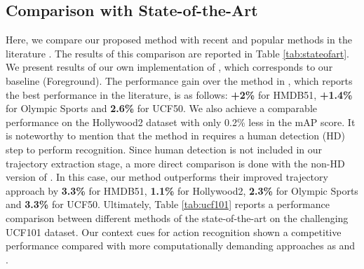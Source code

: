 \documentclass[runningheads]{llncs}
\begin{document}
\subsection{Comparison with State-of-the-Art}
Here, we compare our proposed method with recent and popular methods in the literature \cite{wang2013, jiang2012, jain2013}. The results of this comparison are reported in Table \ref{tab:stateofart}. We present results of our own implementation of \cite{wang2013}, which corresponds to our baseline (Foreground). The performance gain over the method in \cite{wang2013}, which reports the best performance in the literature, is as follows: \textbf{+2\%} for HMDB51, \textbf{+1.4\%} for Olympic Sports and \textbf{2.6\%} for UCF50. We also achieve a comparable performance on the Hollywood2 dataset with only 0.2\% less in the mAP score. It is noteworthy to mention that the method in \cite{wang2013} requires a human detection (HD) step to perform recognition. Since human detection is not included in our trajectory extraction stage, a more direct comparison is done with the non-HD version of \cite{wang2013}. In this case, our method outperforms their improved trajectory approach by \textbf{3.3\%} for HMDB51, \textbf{1.1\%} for Hollywood2, \textbf{2.3\%} for Olympic Sports and \textbf{3.3\%} for UCF50. Ultimately, Table \ref{tab:ucf101} reports a performance comparison between different methods of the state-of-the-art on the challenging UCF101 dataset. Our context cues for action recognition shown a competitive performance compared with more computationally demanding approaches as \cite{wang_thumos} and  \cite{simonyan2014}.
\end{document}
